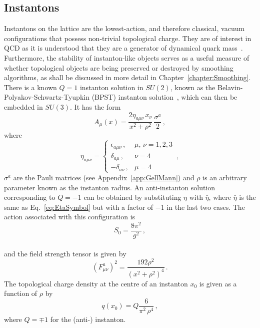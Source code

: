 \subsection{Instantons}\label{sec:Instantons}
Instantons on the lattice are the lowest-action, and therefore classical, vacuum configurations that possess non-trivial topological charge. They are of interest in QCD as it is understood that they are a generator of dynamical quark mass~\cite{Trewartha:2013qga}. Furthermore, the stability of instanton-like objects serves as a useful measure of whether topological objects are being preserved or destroyed by smoothing algorithms, as shall be discussed in more detail in Chapter~\ref{chapter:Smoothing}.\\

There is a known $Q=1$ instanton solution in $SU(2)$, known as the Belavin-Polyakov-Schwartz-Tyupkin (BPST) instanton solution~\cite{Belavin:1975fg}, which can then be embedded in $SU(3)$. It has the form
%
\begin{equation}
A_\mu(x) = \frac{2\eta_{a\mu\nu}\,x_\nu}{x^2+\rho^2}\,\frac{\sigma^a}{2}\, ,
\label{eq:InstantonSolution}
\end{equation}
%
where
%
\begin{equation}
\eta_{a\mu\nu} =
\begin{cases}
\epsilon_{a\mu\nu}\, , & \mu,\,\nu = 1,2,3\\
\delta_{a\mu}\, , & \nu=4\\
-\delta_{a\nu}\, , & \mu=4
\end{cases}\, ,
\label{eq:EtaSymbol}
\end{equation}
%
$\sigma^a$ are the Pauli matrices (see Appendix~\ref{app:GellMann}) and $\rho$ is an arbitrary parameter known as the instanton radius. An anti-instanton solution corresponding to $Q=-1$ can be obtained by substituting $\eta$ with $\bar{\eta}$, where $\bar{\eta}$ is the same as Eq.~\eqref{eq:EtaSymbol} but with a factor of $-1$ in the last two cases. The action associated with this configuration is 
%
\begin{equation}
S_0 = \frac{8\pi^2}{g^2}\, ,
\end{equation}\\
%
and the field strength tensor is given by~\cite{Schafer:1996wv}
%
\begin{equation}
\left(F_{\mu\nu}^a\right)^2 = \frac{192\rho^2}{\left(x^2+\rho^2\right)^4}\, .
\label{eq:InstantonFieldStrength}
\end{equation}
%
The topological charge density at the centre of an instanton $x_0$ is given as a function of $\rho$ by~\cite{Trewartha:2013qga}
%
\begin{equation}
q(x_0) = Q\frac{6}{\pi^2\,\rho^4}\, ,\label{eq:InstProfile}
\end{equation}
%
where $Q=\mp 1$ for the (anti-) instanton.\\

